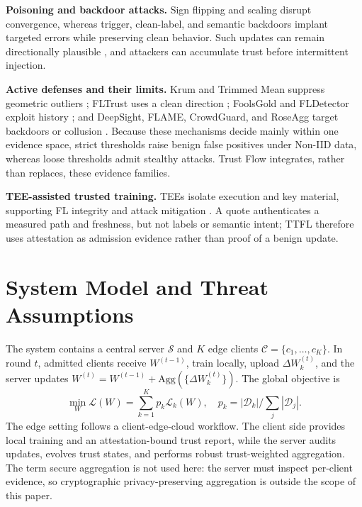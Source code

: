 \documentclass[runningheads,orivec]{llncs}
\begin{document}
\textbf{Poisoning and backdoor attacks.} Sign flipping and scaling disrupt convergence, whereas trigger, clean-label, and semantic backdoors implant targeted errors while preserving clean behavior. Such updates can remain directionally plausible \cite{bagdasaryan2020backdoor,wang2019neuralcleanse}, and attackers can accumulate trust before intermittent injection.

\textbf{Active defenses and their limits.} Krum and Trimmed Mean suppress geometric outliers \cite{blanchard2017krum,yin2018byzantine}; FLTrust uses a clean direction \cite{cao2021fltrust}; FoolsGold and FLDetector exploit history \cite{fung2020foolsgold,fldetector2022}; and DeepSight, FLAME, CrowdGuard, and RoseAgg target backdoors or collusion \cite{deepsight2022,flame2022,crowdguard2024,roseagg}. Because these mechanisms decide mainly within one evidence space, strict thresholds raise benign false positives under Non-IID data, whereas loose thresholds admit stealthy attacks. Trust Flow integrates, rather than replaces, these evidence families.

\textbf{TEE-assisted trusted training.} TEEs isolate execution and key material, supporting FL integrity and attack mitigation \cite{r1_tee_integrity,xu2021distributed,zhang2025rppfl,r5_tee_mitigating,lu2025tmt}. A quote authenticates a measured path and freshness, but not labels or semantic intent; TTFL therefore uses attestation as admission evidence rather than proof of a benign update.

\section{System Model and Threat Assumptions}

The system contains a central server $\mathcal{S}$ and $K$ edge clients $\mathcal{C}=\{c_1,\ldots,c_K\}$. In round $t$, admitted clients receive $W^{(t-1)}$, train locally, upload $\Delta W_k^{(t)}$, and the server updates $W^{(t)}=W^{(t-1)}+\mathrm{Agg}(\{\Delta W_k^{(t)}\})$. The global objective is
\begin{equation}
    \min_W \mathcal{L}(W)=\sum_{k=1}^{K}p_k\mathcal{L}_k(W),\quad
    p_k=|\mathcal{D}_k|/\sum_j|\mathcal{D}_j|.
\end{equation}
The edge setting follows a client-edge-cloud workflow. The client side provides local training and an attestation-bound trust report, while the server audits updates, evolves trust states, and performs robust trust-weighted aggregation. The term secure aggregation is not used here: the server must inspect per-client evidence, so cryptographic privacy-preserving aggregation is outside the scope of this paper.
\end{document}

